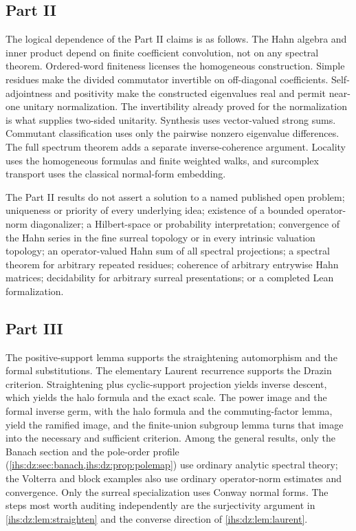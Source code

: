 \documentclass[11pt,a4paper]{article}
\numberwithin{equation}{section}
\theoremstyle{definition}
\theoremstyle{remark}
\begin{document}
\subsection{Part II}\label{ihs:app:ledgerB}
The logical dependence of the Part II claims is as follows. The Hahn algebra
and inner product depend on finite coefficient convolution, not on any
spectral theorem. Ordered-word finiteness licenses the homogeneous
construction. Simple residues make the divided commutator invertible on
off-diagonal coefficients. Self-adjointness and positivity make the
constructed eigenvalues real and permit near-one unitary normalization. The
invertibility already proved for the normalization is what supplies
two-sided unitarity. Synthesis uses vector-valued strong sums. Commutant
classification uses only the pairwise nonzero eigenvalue differences. The
full spectrum theorem adds a separate inverse-coherence argument. Locality
uses the homogeneous formulas and finite weighted walks, and surcomplex
transport uses the classical normal-form embedding.

The Part II results do not assert a solution to a named published open
problem; uniqueness or priority of every underlying idea; existence of a
bounded operator-norm diagonalizer; a Hilbert-space or probability
interpretation; convergence of the Hahn series in the fine surreal topology
or in every intrinsic valuation topology; an operator-valued Hahn sum of all
spectral projections; a spectral theorem for arbitrary repeated residues;
coherence of arbitrary entrywise Hahn matrices; decidability for arbitrary
surreal presentations; or a completed Lean formalization.

\subsection{Part III}\label{ihs:app:ledgerC}
The positive-support lemma supports the straightening automorphism and the
formal substitutions. The elementary Laurent recurrence supports the Drazin
criterion. Straightening plus cyclic-support projection yields inverse
descent, which yields the halo formula and the exact scale. The power image
and the formal inverse germ, with the halo formula and the commuting-factor
lemma, yield the ramified image, and the finite-union subgroup lemma turns
that image into the necessary and sufficient criterion. Among the general
results, only the Banach section and the pole-order profile
(\cref{ihs:dz:sec:banach,ihs:dz:prop:polemap}) use ordinary analytic spectral
theory; the Volterra and block examples also use ordinary operator-norm
estimates and convergence. Only the surreal specialization
uses Conway normal forms. The steps most worth auditing independently are
the surjectivity argument in \cref{ihs:dz:lem:straighten} and the converse
direction of \cref{ihs:dz:lem:laurent}.
\end{document}
